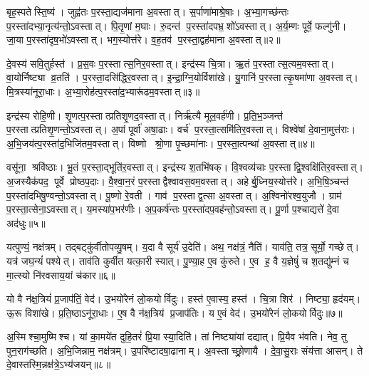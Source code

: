 बृह॒स्पतेस्ति॒ष्य॑।
जुह्व॑तः प॒रस्ता॒द्यज॑माना अ॒वस्तात्।
स॒र्पाणा॑माश्रे॒षाः।
अ॒भ्या॒गच्छ॑न्तः प॒रस्ता॑दभ्या॒नृत्य॑न्तो॒\-ऽवस्तात्।
पि॒तृ॒णां म॒घाः।
रु॒दन्त॑ प॒रस्ता॑दपभ्र॒शो॑ऽवस्तात्।
अ॒र्य॒म्णः पूर्वे॒ फल्गु॑नी।
जा॒या प॒रस्ता॑दृष॒भो॑ऽवस्तात्।
भग॒स्योत्त॑रे।
व॒ह॒तव॑ प॒रस्ता॒द्वह॑माना अ॒वस्तात्॥२॥

दे॒वस्य॑ सवि॒तुर्\mbox{}हस्त॑।
प्र॒स॒वः प॒रस्तात्स॒निर॒वस्तात्।
इन्द्र॑स्य चि॒त्रा।
ऋ॒तं प॒रस्तात्स॒त्यम॒वस्तात्।
वा॒योर्निष्ट्या व्र॒तति॑।
प॒रस्ता॒दसि॑द्धिर॒वस्तात्।
इ॒न्द्रा॒ग्नि॒योर्विशा॑खे।
यु॒गानि॑ प॒रस्तात्कृ॒षमा॑णा अ॒वस्तात्।
मि॒त्रस्या॑नूरा॒धाः।
अ॒भ्या॒रोह॑त्प॒रस्ता॑द॒भ्यारू॑ढम॒वस्तात्॥३॥

इन्द्र॑स्य रोहि॒णी।
शृ॒णत्प॒रस्तात्प्रतिशृ॒णद॒वस्तात्।
निर्\mbox{}ऋ॑त्यै मूल॒वर्\mbox{}ह॑णी।
प्र॒ति॒भ॒ञ्जन्त॑ प॒रस्तात्प्रतिशृ॒णन्तो॒ऽवस्तात्।
अ॒पां पूर्वा॑ अषा॒ढाः।
वर्च॑ प॒रस्ता॒त्समि॑तिर॒वस्तात्।
विश्वे॑षां दे॒वाना॒मुत्त॑राः।
अ॒भि॒जय॑त्प॒रस्ता॑द॒भिजि॑तम॒वस्तात्।
विष्णो श्रो॒णा पृ॒च्छमा॑नाः।
प॒रस्ता॒त्पन्था॑ अ॒वस्तात्॥४॥

वसू॑ना॒ श्रवि॑ष्ठाः।
भू॒तं प॒रस्ता॒द्भूति॑र॒वस्तात्।
इन्द्र॑स्य श॒तभि॑षक्।
वि॒श्वव्य॑चाः प॒रस्ताद्वि॒श्वक्षि॑तिर॒वस्तात्।
अ॒जस्यैक॑पद॒ पूर्वे प्रोष्ठप॒दाः।
वै॒श्वा॒न॒रं प॒रस्ताद्वैश्वावस॒वम॒\-वस्तात्।
अहेर्बु॒ध्निय॒स्योत्त॑रे।
अ॒भि॒षि॒ञ्चन्त॑ प॒रस्ता॑दभि\-षु॒ण्वन्तो॒ऽवस्तात्।
पू॒ष्णो रे॒वती।
गाव॑ प॒रस्ताद्व॒त्सा अ॒वस्तात्।
अ॒श्विनो॑रश्व॒युजौ।
ग्राम॑ प॒रस्ता॒त्सेना॒ऽवस्तात्।
य॒मस्या॑प॒भर॑णीः।
अ॒प॒कर्\mbox{}ष॑न्तः प॒रस्ता॑दप॒वह॑न्तो॒ऽवस्तात्।
पू॒र्णा प॒श्चाद्यत्ते॑ दे॒वा अद॑धुः॥५॥\anuvakamend[आ॒र्द्रम॒वस्ता॒द्वह॑माना अ॒वस्ता॑द॒भ्यारू॑ढम॒वस्ता॒त्पन्था॑ अ॒वस्ताद्व॒त्सा अ॒वस्ता॒त्पञ्च॑ च]

यत्पुण्यं॒ नक्ष॑त्रम्।
तद्बट्कु॑र्वीतोपव्यु॒षम्।
य॒दा वै सूर्य॑ उ॒देति॑।
अथ॒ नक्ष॑त्रं॒ नैति॑।
याव॑ति॒ तत्र॒ सूर्यो॒ गच्छेत्।
यत्र॑ जघ॒न्यं॑ पश्येत्।
ताव॑ति कुर्वीत यत्का॒री स्यात्।
पु॒ण्या॒ह ए॒व कु॑रुते।
ए॒व ह॒ वै य॒ज्ञेषुं॑ च श॒तद्यु॑म्नं च मा॒त्स्यो नि॑रवसाय॒यां च॑कार॥६॥

यो वै न॑क्ष॒त्रियं॑ प्र॒जाप॑तिं॒ वेद॑।
उ॒भयो॑रेनं लो॒कयोर्विदुः।
हस्त॑ ए॒वास्य॒ हस्त॑।
चि॒त्रा शिर॑।
निष्ट्या॒ हृद॑यम्।
ऊ॒रू विशा॑खे।
प्र॒ति॒ष्ठाऽनू॑रा॒धाः।
ए॒ष वै न॑क्ष॒त्रिय॑ प्र॒जाप॑तिः।
य ए॒वं वेद॑।
उ॒भयो॑रेनं लो॒कयोर्विदुः॥७॥

अ॒स्मिश्चा॒मुष्मिश्च।
यां का॒मये॑त दुहि॒तरं॑ प्रि॒या स्या॒दिति॑।
तां निष्ट्या॑यां दद्यात्।
प्रि॒यैव भ॑वति।
नेव॒ तु पुन॒राग॑च्छति।
अ॒भि॒जिन्नाम॒ नक्ष॑त्रम्।
उ॒परि॑ष्टादषा॒ढानाम्।
अ॒वस्ताच्छ्रो॒णायै।
दे॒वा॒सु॒राः संय॑त्ता आसन्।
ते दे॒वास्तस्मि॒न्नक्ष॑त्रे॒ऽभ्य॑जयन्॥८॥

